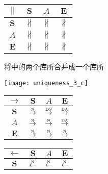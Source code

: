 \begin{figure}[htbp]
\begin{subfigure}{1\textwidth}
\begin{minipage}[b]{0.3\textwidth}
      \begin{tabular}{|c|c|c|c|} \hline
        $\parallel$ & $\bm{S}$ & $A$ & $\bm{E}$\\ \hline
        $\bm{S}$ & $\nparallel$ & $\nparallel$ & $\nparallel$\\ \hline
        $A$ & $\nparallel$ & $\nparallel$ & $\nparallel$\\ \hline
        $\bm{E}$ & $\nparallel$ & $\nparallel$ & $\nparallel$\\ \hline
      \end{tabular}
    \end{minipage}
    \caption{将中的两个库所合并成一个库所}
    \label{fig:uniqueness_3_b}
  \end{subfigure}

  \begin{subfigure}{1\textwidth}
    \vspace{1em}
    \centering
    \begin{minipage}[b]{1\textwidth}
      \centering
      \texttt{[image: uniqueness\_3\_c]}
    \end{minipage}
    \begin{minipage}[b]{0.3\textwidth}
      \vspace{1em}
      \centering
      \begin{tabular}{|c|c|c|c|} \hline
        $\rightarrow$ & $\bm{S}$ & $A$ & $\bm{E}$\\ \hline
        $\bm{S}$ & $\overset{\text{\tiny{N}}}{\rightarrow}$ & $\overset{\text{\tiny{DS}}}{\rightarrow}$ & $\overset{\text{\tiny{DA}}}{\rightarrow}$\\ \hline
        $A$ & $\overset{\text{\tiny{N}}}{\rightarrow}$ & $\overset{\text{\tiny{N}}}{\rightarrow}$ & $\overset{\text{\tiny{DA}}}{\rightarrow}$\\ \hline
        $\bm{E}$ & $\overset{\text{\tiny{N}}}{\rightarrow}$ & $\overset{\text{\tiny{N}}}{\rightarrow}$ & $\overset{\text{\tiny{N}}}{\rightarrow}$\\ \hline
      \end{tabular}
    \end{minipage}
    \begin{minipage}[b]{0.3\textwidth}
      \vspace{1em}
      \centering
      \begin{tabular}{|c|c|c|c|} \hline
        $\leftarrow$ & $\bm{S}$ & $A$ & $\bm{E}$\\ \hline
        $\bm{S}$ & $\overset{\text{\tiny{N}}}{\leftarrow}$ & $\overset{\text{\tiny{N}}}{\leftarrow}$ & $\overset{\text{\tiny{N}}}{\leftarrow}$\\ \hline

\end{tabular}
\end{minipage}
\end{subfigure}
\end{figure}
